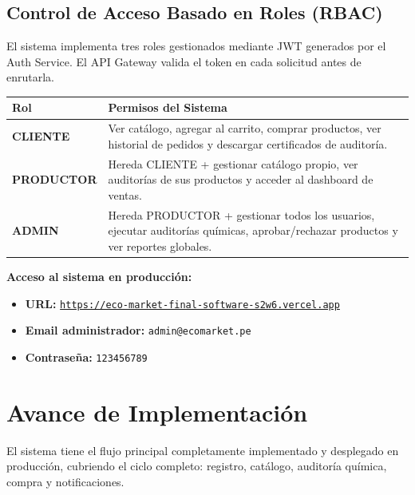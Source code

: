 \documentclass[12pt,a4paper]{article}
\begin{document}
\subsection{Control de Acceso Basado en Roles (RBAC)}

El sistema implementa tres roles gestionados mediante JWT generados por el Auth Service.
El API Gateway valida el token en cada solicitud antes de enrutarla.

\begin{center}
\begin{tabular}{|L{2.8cm}|L{11.2cm}|}
\hline
{}
\color{white}\textbf{Rol} & \color{white}\textbf{Permisos del Sistema} \\
\hline
\textbf{CLIENTE} &
Ver cat\'alogo, agregar al carrito, comprar productos, ver historial de
pedidos y descargar certificados de auditor\'ia. \\
\hline
\textbf{PRODUCTOR} &
Hereda CLIENTE + gestionar cat\'alogo propio, ver auditor\'ias de sus
productos y acceder al dashboard de ventas. \\
\hline
\textbf{ADMIN} &
Hereda PRODUCTOR + gestionar todos los usuarios, ejecutar auditor\'ias
qu\'imicas, aprobar/rechazar productos y ver reportes globales. \\
\hline
\end{tabular}
\end{center}

\medskip
\textbf{Acceso al sistema en producci\'on:}

\begin{itemize}[leftmargin=1.5cm]
  \item \textbf{URL:} \href{https://eco-market-final-software-s2w6.vercel.app}{\texttt{https://eco-market-final-software-s2w6.vercel.app}}
  \item \textbf{Email administrador:} \texttt{admin@ecomarket.pe}
  \item \textbf{Contrase\~na:} \texttt{123456789}
\end{itemize}

\newpage

\section{Avance de Implementaci\'on}

El sistema tiene el flujo principal completamente implementado y desplegado en
producci\'on, cubriendo el ciclo completo: registro, cat\'alogo, auditor\'ia qu\'imica,
compra y notificaciones.
\end{document}
